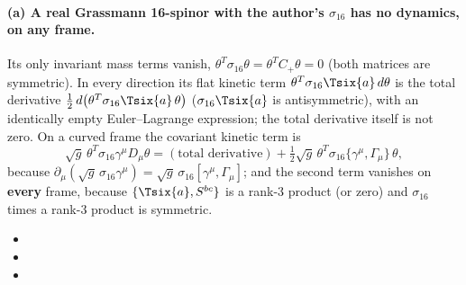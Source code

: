 \paragraph{(a) A real Grassmann 16-spinor with the author's $\sigma_{16}$ has no dynamics, on any
frame.} Its only invariant mass terms vanish, $\theta^{T}\sigma_{16}\theta=\theta^{T}C_+\theta=0$
(both matrices are symmetric). In every direction its flat kinetic term
$\theta^{T}\sigma_{16}\Tsix{a}\,d\theta$ is the total derivative
$\tfrac12\,d\bigl(\theta^{T}\sigma_{16}\Tsix{a}\,\theta\bigr)$ ($\sigma_{16}\Tsix{a}$ is
antisymmetric), with an identically empty Euler--Lagrange expression; the total derivative itself is
not zero. On a curved frame the covariant kinetic term is
\[
  \sqrt g\,\theta^{T}\sigma_{16}\gamma^\mu D_\mu\theta=(\text{total derivative})
  +\tfrac12\sqrt g\,\theta^{T}\sigma_{16}\{\gamma^\mu,\Gamma_\mu\}\,\theta ,
\]
because $\partial_\mu(\sqrt g\,\sigma_{16}\gamma^\mu)=\sqrt g\,\sigma_{16}[\gamma^\mu,\Gamma_\mu]$;
and the second term vanishes on \textbf{every} frame, because $\{\Tsix{a},S^{bc}\}$ is a rank-3
product (or zero) and $\sigma_{16}$ times a rank-3 product is symmetric. 
\begin{itemize}
  \item {}
  \item {}
  \item {}
\end{itemize}

